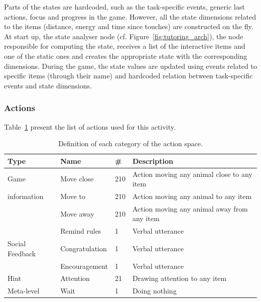 Parts of the states are hardcoded, such as the task-specific events, generic last actions, focus and progress in the game. However, all the state dimensions related to the items (distance, energy and time since touches) are constructed on the fly. At start up, the state analyser node (cf. Figure~\ref{fig:tutoring_arch}), the node responsible for computing the state, receives a list of the interactive items and one of the static ones and creates the appropriate state with the corresponding dimensions. During the game, the state values are updated using events related to specific items (through their name) and hardcoded relation between task-specific events and state dimensions. 


\subsubsection{Actions}

Table~\ref{tab:tuto_actions_space} present the list of actions used for this activity.

\begin{table}[ht]
	\centering
	\caption{Definition of each category of the action space.}
	\label{tab:tuto_actions_space}
	\begin{tabularx}{\textwidth}{@{}lllX@{}}\toprule
		Type & Name & \# & Description \\
		\midrule
		Game & Move close & 210 &  Action moving any animal close to any item\\
		information & Move to & 210 & Action moving any animal to any item\\
		& Move away & 210 & Action moving any animal away from any item\\
		& Remind rules & 1 & Verbal utterance\\
		Social Feedback & Congratulation & 1 & Verbal utterance\\
		& Encouragement & 1 & Verbal utterance\\
		Hint & Attention & 21 & Drawing attention to any item\\
		Meta-level & Wait & 1 & Doing nothing\\
		\bottomrule
	\end{tabularx}
\end{table}

